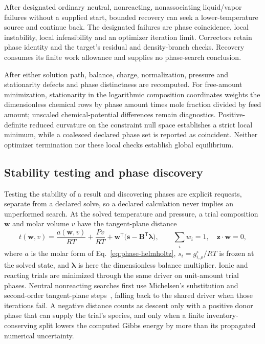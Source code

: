 After designated ordinary neutral, nonreacting, nonassociating liquid/vapor failures without a supplied start, bounded recovery can seek a lower-temperature source and continue back.
The designated failures are phase coincidence, local instability, local infeasibility and an optimizer iteration limit.
Correctors retain phase identity and the target's residual and density-branch checks.
Recovery consumes its finite work allowance and supplies no phase-search conclusion.


After either solution path, balance, charge, normalization, pressure and stationarity defects and phase distinctness are recomputed.
For free-amount minimization, stationarity in the logarithmic composition coordinates weights the dimensionless chemical rows by phase amount times mole fraction divided by feed amount; unscaled chemical-potential differences remain diagnostics.
Positive-definite reduced curvature on the constraint null space establishes a strict local minimum, while a coalesced declared phase set is reported as coincident.
Neither optimizer termination nor these local checks establish global equilibrium.


\subsection{Stability testing and phase discovery}
\label{sec:stability}
Testing the stability of a result and discovering phases are explicit requests, separate from a declared solve, so a declared calculation never implies an unperformed search.
At the solved temperature and pressure, a trial composition $\mathbf{w}$ and molar volume $v$ have the tangent-plane distance~\citep{Michelsen1982,Pereira2012,Perdomo2025}
\begin{equation}
t(\mathbf{w},v)=\frac{a(\mathbf{w},v)}{RT}+\frac{Pv}{RT}+\mathbf{w}^{\mathsf T}\bigl(\mathbf{s}-\mathbf{B}^{\mathsf T}\boldsymbol{\lambda}\bigr),\qquad
\sum_iw_i=1,\quad\mathbf{z}\cdot\mathbf{w}=0,
\label{eq:tpd}
\end{equation}
where $a$ is the molar form of Eq.~\eqref{eq:phase-helmholtz}, $s_i=g^{\circ}_{i,\rho}/RT$ is frozen at the solved state, and $\boldsymbol\lambda$ is here the dimensionless balance multiplier.
Ionic and reacting trials are minimized through the same driver on unit-amount trial phases.
Neutral nonreacting searches first use Michelsen's substitution and second-order tangent-plane steps~\citep{Michelsen1982}, falling back to the shared driver when those iterations fail.
A negative distance counts as descent only with a positive donor phase that can supply the trial's species, and only when a finite inventory-conserving split lowers the computed Gibbs energy by more than its propagated numerical uncertainty.

